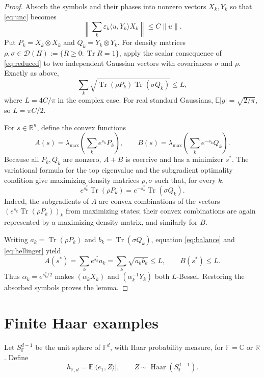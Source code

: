 \documentclass[11pt]{article}
\newcommand{\C}{\mathbb C}
\newcommand{\R}{\mathbb R}
\newcommand{\Dens}{\mathcal D}
\newcommand{\Tr}{\operatorname{Tr}}
\begin{document}
\begin{proof}
Absorb the symbols and their phases into nonzero vectors $X_k,Y_k$ so that
\eqref{eq:unc} becomes
\begin{equation}\label{eq:reduced}
 \left\|\sum_k\varepsilon_k\langle u,Y_k\rangle X_k\right\|
 \leq C\|u\|.
\end{equation}
Put $P_k=X_k\otimes X_k$ and $Q_k=Y_k\otimes Y_k$.  For density matrices
$\rho,\sigma\in\Dens(H):=\{R\geq0:\Tr R=1\}$, apply the scalar consequence
of \eqref{eq:reduced} to two independent Gaussian vectors with covariances
$\sigma$ and $\rho$.  Exactly as above,
\begin{equation}\label{eq:hellinger}
 \sum_k\sqrt{\Tr(\rho P_k)\Tr(\sigma Q_k)}\leq L,
\end{equation}
where $L=4C/\pi$ in the complex case.  For real standard Gaussians,
$\mathbb E|g|=\sqrt{2/\pi}$, so $L=\pi C/2$.

For $s\in\R^n$, define the convex functions
\[
 A(s)=\lambda_{\max}\!\left(\sum_k e^{s_k}P_k\right),
 \qquad
 B(s)=\lambda_{\max}\!\left(\sum_k e^{-s_k}Q_k\right).
\]
Because all $P_k,Q_k$ are nonzero, $A+B$ is coercive and has a minimizer
$s^*$.  The variational formula for the top eigenvalue and the subgradient
optimality condition give maximizing density matrices $\rho,\sigma$ such
that, for every $k$,
\begin{equation}\label{eq:balance}
 e^{s_k^*}\Tr(\rho P_k)=e^{-s_k^*}\Tr(\sigma Q_k).
\end{equation}
Indeed, the subgradients of $A$ are convex combinations of the vectors
$(e^{s_k}\Tr(\rho P_k))_k$ from maximizing states; their convex combinations
are again represented by a maximizing density matrix, and similarly for
$B$.

Writing $a_k=\Tr(\rho P_k)$ and $b_k=\Tr(\sigma Q_k)$, equation
\eqref{eq:balance} and \eqref{eq:hellinger} yield
\[
 A(s^*)=\sum_k e^{s_k^*}a_k=\sum_k\sqrt{a_kb_k}\leq L,
 \qquad B(s^*)\leq L.
\]
Thus $\alpha_k=e^{s_k^*/2}$ makes $(\alpha_kX_k)$ and
$(\alpha_k^{-1}Y_k)$ both $L$-Bessel.  Restoring the absorbed symbols proves
the lemma.
\end{proof}

\section*{Finite Haar examples}

Let $S_{\mathbb F}^{d-1}$ be the unit sphere of $\mathbb F^d$, with Haar
probability measure, for $\mathbb F=\C$ or $\R$.  Define
\[
 h_{\mathbb F,d}=\mathbb E|\langle e_1,Z\rangle|,
 \qquad Z\sim\operatorname{Haar}(S_{\mathbb F}^{d-1}).
\]
\end{document}
